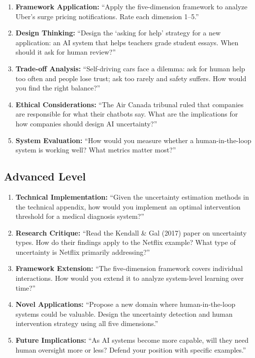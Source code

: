 \begin{enumerate}
    \item \textbf{Framework Application:} ``Apply the five-dimension framework to analyze Uber's surge pricing notifications. Rate each dimension 1--5.''

    \item \textbf{Design Thinking:} ``Design the `asking for help' strategy for a new application: an AI system that helps teachers grade student essays. When should it ask for human review?''

    \item \textbf{Trade-off Analysis:} ``Self-driving cars face a dilemma: ask for human help too often and people lose trust; ask too rarely and safety suffers. How would you find the right balance?''

    \item \textbf{Ethical Considerations:} ``The Air Canada tribunal ruled that companies are responsible for what their chatbots say. What are the implications for how companies should design AI uncertainty?''

    \item \textbf{System Evaluation:} ``How would you measure whether a human-in-the-loop system is working well? What metrics matter most?''
\end{enumerate}

\subsection{Advanced Level}

\begin{enumerate}
    \item \textbf{Technical Implementation:} ``Given the uncertainty estimation methods in the technical appendix, how would you implement an optimal intervention threshold for a medical diagnosis system?''

    \item \textbf{Research Critique:} ``Read the Kendall \& Gal (2017) paper on uncertainty types. How do their findings apply to the Netflix example? What type of uncertainty is Netflix primarily addressing?''

    \item \textbf{Framework Extension:} ``The five-dimension framework covers individual interactions. How would you extend it to analyze system-level learning over time?''

    \item \textbf{Novel Applications:} ``Propose a new domain where human-in-the-loop systems could be valuable. Design the uncertainty detection and human intervention strategy using all five dimensions.''

    \item \textbf{Future Implications:} ``As AI systems become more capable, will they need human oversight more or less? Defend your position with specific examples.''
\end{enumerate}

